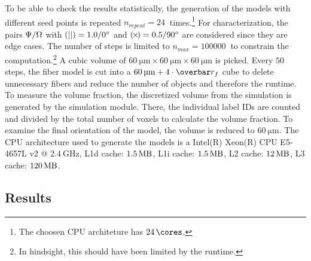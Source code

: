 %
To be able to check the results statistically, the generation of the models with different seed points is repeated  $n_{\mathit{repeat}} = \SI{24}{}$ times.\footnote{The choosen \ac{CPU} architeture has $\SI{24}{\cores}$.}
For characterization, the pairs $\textnormal{$\Psi$}/\textnormal{$\Omega$}$ with $\textnormal{$(||)$} = \SI{1.0}{}/\SI{0}{\degree}$ and $\textnormal{$(\!\times\!)$}=\SI{0.5}{}/\SI{90}{\degree}$ are considered since they are edge cases.
The number of steps is limited to $n_{\mathit{max}}=\SI{100000}{}$ to constrain the computation.\footnote{In hindsight, this should have been limited by the runtime.}
A cubic volume of $\SI{60}{\micro\meter} \times \SI{60}{\micro\meter} \times \SI{60}{\micro\meter}$ is picked.
Every $\SI{50}{}$ steps, the fiber model is cut into a $\SI{60}{\micro\meter}+4 \cdot \fiberRadiusMean$ cube to delete unnecessary fibers and reduce the number of objects and therefore the runtime.
To measure the volume fraction, the discretized volume from the simulation is generated by the simulation module.
There, the individual label IDs are counted and divided by the total number of voxels to calculate the volume fraction.
To examine the final orientation of the model, the volume is reduced to $\SI{60}{\micro\meter}$.
The \ac{CPU} architecture used to generate the models is a
Intel(R) Xeon(R) CPU E5-4657L v2 @ $\SI{2.4}{\giga\hertz}$, L1d cache: $\SI{1.5}{\mega\byte}$, L1i cache: $\SI{1.5}{\mega\byte}$, L2 cache: $\SI{12}{\mega\byte}$, L3 cache: $\SI{120}{\mega\byte}$.
%
%
%
\subsection{Results} \label{sec:solverParameterResults}
%
